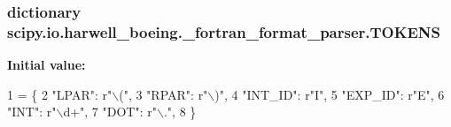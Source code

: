 \subsubsection[{T\+O\+K\+E\+N\+S}]{\setlength{\rightskip}{0pt plus 5cm}dictionary scipy.\+io.\+harwell\+\_\+boeing.\+\_\+fortran\+\_\+format\+\_\+parser.\+T\+O\+K\+E\+N\+S}\label{namespacescipy_1_1io_1_1harwell__boeing_1_1__fortran__format__parser_abb69dcaa8c934b1b8fd9c03e1b2230be}
{\bfseries Initial value\+:}
\begin{DoxyCode}
1 = \{
2     \textcolor{stringliteral}{"LPAR"}: \textcolor{stringliteral}{r"\(\backslash\)("},
3     \textcolor{stringliteral}{"RPAR"}: \textcolor{stringliteral}{r"\(\backslash\))"},
4     \textcolor{stringliteral}{"INT\_ID"}: \textcolor{stringliteral}{r"I"},
5     \textcolor{stringliteral}{"EXP\_ID"}: \textcolor{stringliteral}{r"E"},
6     \textcolor{stringliteral}{"INT"}: \textcolor{stringliteral}{r"\(\backslash\)d+"},
7     \textcolor{stringliteral}{"DOT"}: \textcolor{stringliteral}{r"\(\backslash\)."},
8 \}
\end{DoxyCode}
